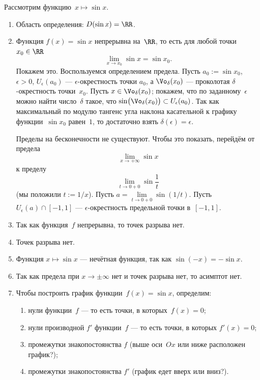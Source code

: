 \begin{solution}
	Рассмотрим функцию~$x \mapsto \sin{x}$.
	\begin{enumerate}[1.]
		\item Область определения: $D(\sin{x}) = \RR$.
		\item Функция $f(x) = \sin{x}$ непрерывна на~$\RR$, то есть для любой
			точки~$x_0 \in \RR$
			\[
				\lim_{x \to x_0} \sin{x} = \sin{x_0}.
			\]
			Покажем это. Воспользуемся определением предела. Пусть $a_0 :=
			\sin{x_0}$, $\epsilon > 0$, $U_{\epsilon}(a_0)$ ---
			$\epsilon$-окрестность точки $a_0$, а $\Vo_{\delta}(x_0)$ --- проколотая
			$\delta$-окрестность точки~$x_0$.  Пусть $x \in \Vo_\delta(x_0)$;
			покажем, что по заданному~$\epsilon$ можно найти число~$\delta$ такое,
			что $\sin \bigl( \Vo_\delta(x_0) \bigr) \subset U_\epsilon (a_0)$. Так
			как максимальный по модулю тангенс угла наклона касательной к графику
			функции~$\sin{x_0}$ равен~$1$, то достаточно взять $\delta(\epsilon) =
			\epsilon$.

			Пределы на бесконечности не существуют. Чтобы это показать, перейдём от
			предела
			\[
				\lim_{x \to +\infty} {\sin{x}}
			\]
			к пределу
			\[
				\lim_{t \to 0 + 0}{\sin{\frac{1}{t}}}
			\]
			(мы положили $t := 1/x$).
			Пусть $a = \lim\limits_{t \to 0 + 0} \sin(1/t)$. Пусть $U_\epsilon(a)
			\cap [-1, 1]$ --- $\epsilon$-окрестность предельной точки в~$[-1, 1]$.

		\item Так как функция~$f$ непрерывна, то точек разрыва нет.

		\item Точек разрыва нет.

		\item Функция $x \mapsto \sin{x}$ --- нечётная функция, так как $\sin(-x) =
			-\sin{x}$.

		\item Так как предела при $x \to \pm \infty$ нет и точек разрыва нет, то
			асимптот нет.

		\item Чтобы построить график функции~$f(x) = \sin{x}$, определим:
			\begin{enumerate}[1)]
				\item нули функции~$f$ --- то есть точки, в которых~$f(x) = 0$;
				\item нули производной $f'$ функции~$f$ --- то есть точки, в которых
					$f'(x) = 0$;
				\item промежутки знакопостоянства $f$ (выше оси~$Ox$ или ниже
					расположен график?);
				\item промежутки знакопостоянства $f'$ (график едет вверх или вниз?).
			\end{enumerate}


\end{enumerate}
\end{solution}
